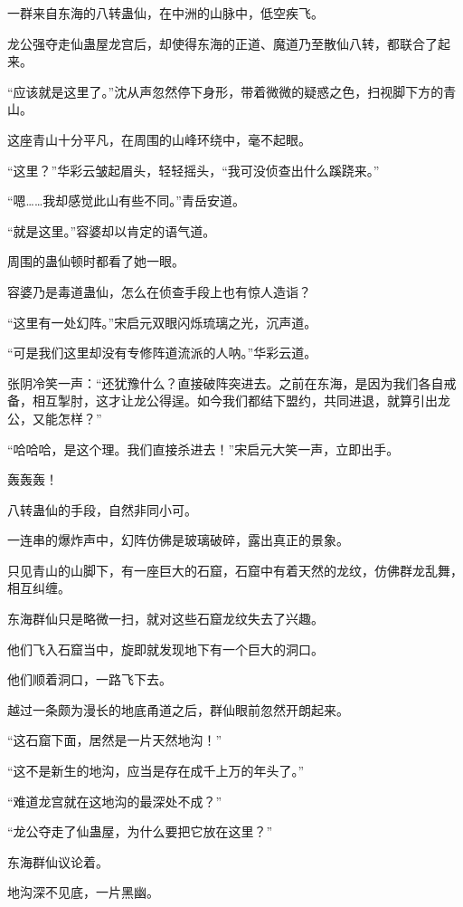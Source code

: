 
\begin{this_body}

一群来自东海的八转蛊仙，在中洲的山脉中，低空疾飞。

龙公强夺走仙蛊屋龙宫后，却使得东海的正道、魔道乃至散仙八转，都联合了起来。

“应该就是这里了。”沈从声忽然停下身形，带着微微的疑惑之色，扫视脚下方的青山。

这座青山十分平凡，在周围的山峰环绕中，毫不起眼。

“这里？”华彩云皱起眉头，轻轻摇头，“我可没侦查出什么蹊跷来。”

“嗯……我却感觉此山有些不同。”青岳安道。

“就是这里。”容婆却以肯定的语气道。

周围的蛊仙顿时都看了她一眼。

容婆乃是毒道蛊仙，怎么在侦查手段上也有惊人造诣？

“这里有一处幻阵。”宋启元双眼闪烁琉璃之光，沉声道。

“可是我们这里却没有专修阵道流派的人呐。”华彩云道。

张阴冷笑一声：“还犹豫什么？直接破阵突进去。之前在东海，是因为我们各自戒备，相互掣肘，这才让龙公得逞。如今我们都结下盟约，共同进退，就算引出龙公，又能怎样？”

“哈哈哈，是这个理。我们直接杀进去！”宋启元大笑一声，立即出手。

轰轰轰！

八转蛊仙的手段，自然非同小可。

一连串的爆炸声中，幻阵仿佛是玻璃破碎，露出真正的景象。

只见青山的山脚下，有一座巨大的石窟，石窟中有着天然的龙纹，仿佛群龙乱舞，相互纠缠。

东海群仙只是略微一扫，就对这些石窟龙纹失去了兴趣。

他们飞入石窟当中，旋即就发现地下有一个巨大的洞口。

他们顺着洞口，一路飞下去。

越过一条颇为漫长的地底甬道之后，群仙眼前忽然开朗起来。

“这石窟下面，居然是一片天然地沟！”

“这不是新生的地沟，应当是存在成千上万的年头了。”

“难道龙宫就在这地沟的最深处不成？”

“龙公夺走了仙蛊屋，为什么要把它放在这里？”

东海群仙议论着。

地沟深不见底，一片黑幽。


\end{this_body}
